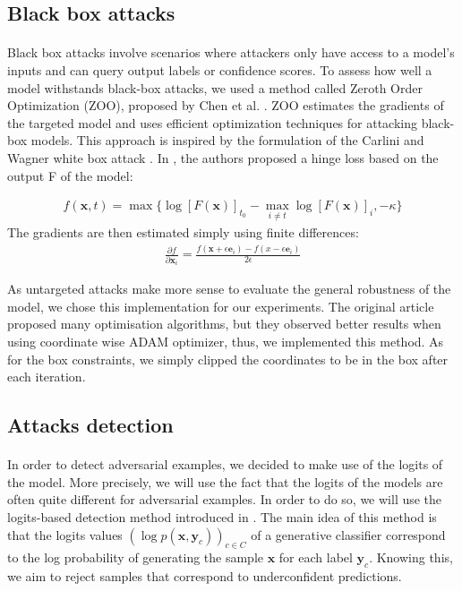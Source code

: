 \documentclass[10pt,twocolumn,letterpaper]{article}
\begin{document}
\subsection{Black box attacks}

\paragraph{}

Black box attacks involve scenarios where attackers only have access to a model's inputs and can query output labels or confidence scores. To assess how well a model withstands black-box attacks, we used a method called Zeroth Order Optimization (ZOO), proposed by Chen et al. \cite{Chen_2017}. ZOO estimates the gradients of the targeted model and uses efficient optimization techniques for attacking black-box models.
This approach is inspired by the formulation of the Carlini and Wagner white box attack \cite{robustness}.
In \cite{Chen_2017}, the authors proposed a hinge loss based on the output F of the model:

\begin{align*}
    f(\bm{x}, t) = \max \{\log[F(\bm{x})]_{t_0} - \max_{i \neq t}\log[F(\bm{x})]_i, -\kappa \}
\end{align*}
The gradients are then estimated simply using finite differences:
\begin{align*}
    \frac{\partial f}{\partial \bm{x}_i} = \frac{f(\bm{x} + \epsilon \bm{e}_i) - f(x - \epsilon \bm{e}_i)}{2 \epsilon}
\end{align*}

As untargeted attacks make more sense to evaluate the general robustness of the model, we chose this implementation for our experiments. The original article proposed many optimisation algorithms, but they observed better results when using coordinate wise ADAM optimizer, thus, we implemented this method. As for the box constraints, we simply clipped the coordinates to be in the box after each iteration.

\subsection{Attacks detection}

\paragraph{} In order to detect adversarial examples, we decided to make use of the logits of the model. More precisely, we will use the fact that the logits of the models are often quite different for adversarial examples. In order to do so, we will use the logits-based detection method introduced in \cite{main_paper}. The main idea of this method is that the logits values $(\log{p(\bm{x}, \bm{y}_c)})_{c \in C}$ of a generative classifier correspond to the log probability of generating the sample $\bm{x}$ for each label $\bm{y}_c$. Knowing this, we aim to reject samples that correspond to underconfident predictions. 
\end{document}
